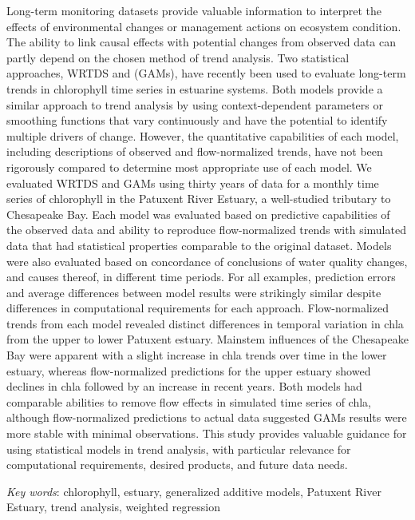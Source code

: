 \documentclass[letterpaper,12pt,oneside]{article}\usepackage[]{graphicx}\usepackage[]{color}
\begin{document}
\noindent Long-term monitoring datasets provide valuable information to interpret the effects of environmental changes or management actions on ecosystem condition.  The ability to link causal effects with potential changes from observed data can partly depend on the chosen method of trend analysis.  Two statistical approaches, \ac{WRTDS} and  (\acp{GAM}), have recently been used to evaluate long-term trends in chlorophyll time series in estuarine systems.  Both models provide a similar approach to trend analysis by using context-dependent parameters or smoothing functions that vary continuously and have the potential to identify multiple drivers of change.  However, the quantitative capabilities of each model, including descriptions of observed and flow-normalized trends, have not been rigorously compared to determine most appropriate use of each model.  We evaluated \ac{WRTDS} and \acp{GAM} using thirty years of data for a monthly time series of chlorophyll in the Patuxent River Estuary, a well-studied tributary to Chesapeake Bay.  Each model was evaluated based on predictive capabilities of the observed data and ability to reproduce flow-normalized trends with simulated data that had statistical properties comparable to the original dataset.  Models were also evaluated based on concordance of conclusions of water quality changes, and causes thereof, in different time periods.  For all examples, prediction errors and average differences between model results were strikingly similar despite differences in computational requirements for each approach.  Flow-normalized trends from each model revealed distinct differences in temporal variation in \ac{chla} from the upper to lower Patuxent estuary.  Mainstem influences of the Chesapeake Bay were apparent with a slight increase in \ac{chla} trends over time in the lower estuary, whereas flow-normalized predictions for the upper estuary showed declines in \ac{chla} followed by an increase in recent years.  Both models had comparable abilities to remove flow effects in simulated time series of \ac{chla}, although flow-normalized predictions to actual data suggested \acp{GAM} results were more stable with minimal observations.  This study provides valuable guidance for using statistical models in trend analysis, with particular relevance for computational requirements, desired products, and future data needs.  

\noindent \textit{Key words}: chlorophyll, estuary, generalized additive models, Patuxent River Estuary, trend analysis, weighted regression
\end{document}
